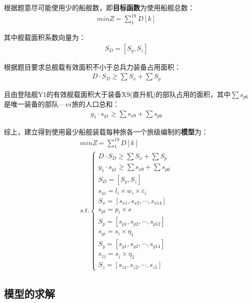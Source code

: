 \documentclass{whutmod}
\begin{document}
	    
	    根据题意尽可能使用少的船舰数，即\textbf{目标函数}为使用船舰总数：
	     \begin{gather}
	    min Z=\sum _{1}^{19}D[k]
	  \end{gather}
	    
	    
	   其中舰载面积系数向量为：
	    \begin{gather*}
	    S_{D}=[S_{y}, S_{z}]
    	\end{gather*}
    	
    	根据题目要求总舰载有效面积不小于总兵力装备占用面积：
    	 \begin{gather*}
    	 D\cdot S_{D}\geq \sum  S_{x} + \sum  S_{p}
    	 \end{gather*}
    	 
    	 且由登陆舰Y1的有效舰载面积大于装备X9(直升机)的部队占用的面积，其中$\sum  s_{p6}$是唯一装备的部队—$\uppercase\expandafter{\romannumeral6}$旅的人口总和：
    	  \begin{gather*}
    	 y_{1}\cdot s_{y1}\geq \sum s_{x9}+ \sum  s_{p6}
    	 \end{gather*}
    	 
    	 

    	 综上，建立得到使用最少船舰装载每种旅各一个旅级编制的\textbf{模型}为：
    	  \begin{gather}
    	 min Z=\sum _{1}^{19}D[k]\\ 
    	  s.t.\left\{\begin{matrix}	 D\cdot S_{D}\geq \sum  S_{x} + \sum  S_{p}
    	 \\ y_{1}\cdot s_{y1}\geq \sum s_{x9}+ \sum  s_{p6}
    	 \\S_{D}=[S_{y}, S_{z}]
    	 \\ s_{xi}=l_{i}\times w_{i} \times \varepsilon _{i}
    	 \\S_{x}=[s_{x1},s_{x2},\cdots,s_{x14}]
    	 \\s_{pi}=p_{i}\times s
    	 \\S_{p}=[s_{p1},s_{p2},\cdots,s_{p12}]
    	 \\     s_{yi}=s_{i}\times \eta_{1}
    	 \\   S_{y}=[s_{y1},s_{y2},\cdots,s_{y14}]
    	 \\      s_{zj}=s_{j}\times \eta_{2}
    	 \\ S_{z}=[s_{z1},s_{z2},\cdots,s_{z5}]
    	 \end{matrix}\right. 
     	 \end{gather}

    		    	
	\subsection{模型的求解}   
\end{document}
